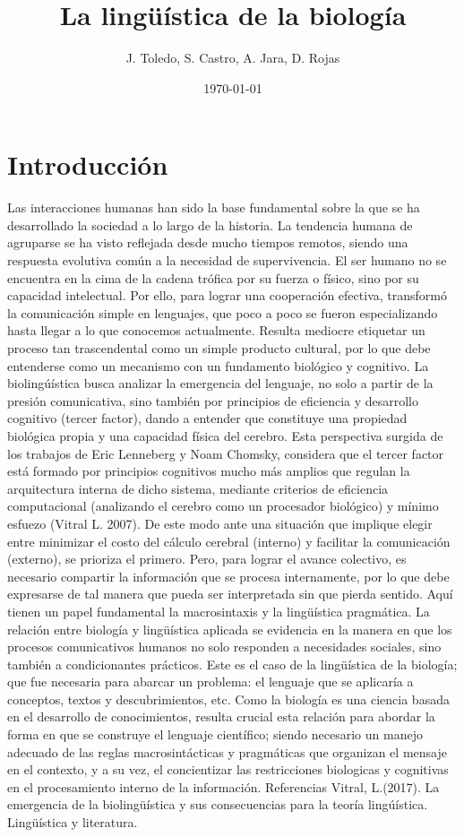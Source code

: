 \documentclass[12pt]{article}
\title{La lingüística de la biología}
\author{J. Toledo, S. Castro, A. Jara, D. Rojas}
\date{\today}
\begin{document}
\maketitle

\section{Introducción}
Las interacciones humanas han sido la base fundamental sobre la que se ha desarrollado la sociedad a lo largo de la historia. La tendencia humana de agruparse se ha visto reflejada desde mucho tiempos remotos, siendo una respuesta evolutiva común a la necesidad de supervivencia. El ser humano no se encuentra en la cima de la cadena trófica por su fuerza o físico, sino por su capacidad intelectual. Por ello, para lograr una cooperación efectiva, transformó la comunicación simple en lenguajes, que poco a poco se fueron especializando hasta llegar a lo que conocemos actualmente. Resulta mediocre etiquetar un proceso tan trascendental como un simple producto cultural, por lo que debe entenderse como un mecanismo con un fundamento biológico y cognitivo. 
La biolingúística busca analizar la emergencia del lenguaje, no solo a partir de la presión comunicativa, sino también por principios de eficiencia y desarrollo cognitivo (tercer factor), dando a entender que constituye una propiedad biológica propia y una capacidad física del cerebro.
Esta perspectiva surgida de los trabajos de Eric Lenneberg y Noam Chomsky, considera que el tercer factor está formado por principios cognitivos mucho más amplios que regulan la arquitectura interna de dicho sistema, mediante criterios de eficiencia computacional (analizando el cerebro como un procesador biológico) y mínimo esfuezo (Vitral L. 2007). De este modo ante una situación que implique elegir entre minimizar el costo del cálculo cerebral (interno) y facilitar la comunicación (externo), se prioriza el primero.
Pero, para lograr el avance colectivo, es necesario compartir la información que se procesa internamente, por lo que debe expresarse de tal manera que pueda ser interpretada sin que pierda sentido. Aquí tienen un papel fundamental la macrosintaxis y la lingüística pragmática.
La relación entre biología y lingüística aplicada se evidencia en la manera en que los procesos comunicativos humanos no solo responden a necesidades sociales, sino también a condicionantes prácticos. Este es el caso de la lingüística de la biología; que fue necesaria para abarcar un problema: el lenguaje que se aplicaría a conceptos, textos y descubrimientos, etc.    
Como la biología es una ciencia basada en el desarrollo de conocimientos, resulta crucial esta relación para abordar la forma en que se construye el lenguaje científico; siendo necesario un  manejo adecuado de las reglas macrosintácticas y pragmáticas que organizan el mensaje en el contexto, y a su vez, el concientizar las restricciones biologicas y cognitivas en el procesamiento interno de la información.  
Referencias
Vitral, L.(2017). La emergencia de la biolingüística y sus consecuencias para la teoría lingúística. Lingüística y literatura.
\end{document}
